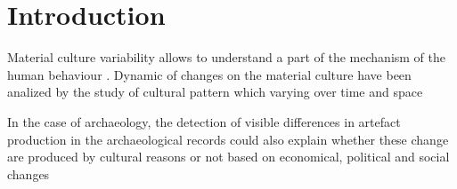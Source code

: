 \documentclass[review]{elsarticle}
\begin{document}



\section{Introduction}


Material culture variability allows to understand a part of the mechanism of the human behaviour \citep{basalla1988evolution}. Dynamic of changes on the material culture have been analized by the study of cultural pattern which varying over time and space \citep{eerkens_jelmer_cultural_2007, lycett_cultural_2015} %

In the case of archaeology, the detection of visible differences in artefact production in the archaeological records could also explain whether these change are produced by cultural reasons or not based on economical, political and social changes %
\end{document}
